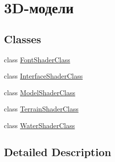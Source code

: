 \hypertarget{group___shaders}{}\section{3\+D-\/модели}
\label{group___shaders}
\subsection*{Classes}
\begin{DoxyCompactItemize}
\item 
class \hyperlink{class_font_shader_class}{Font\+Shader\+Class}
\item 
class \hyperlink{class_interface_shader_class}{Interface\+Shader\+Class}
\item 
class \hyperlink{class_model_shader_class}{Model\+Shader\+Class}
\item 
class \hyperlink{class_terrain_shader_class}{Terrain\+Shader\+Class}
\item 
class \hyperlink{class_water_shader_class}{Water\+Shader\+Class}
\end{DoxyCompactItemize}


\subsection{Detailed Description}
